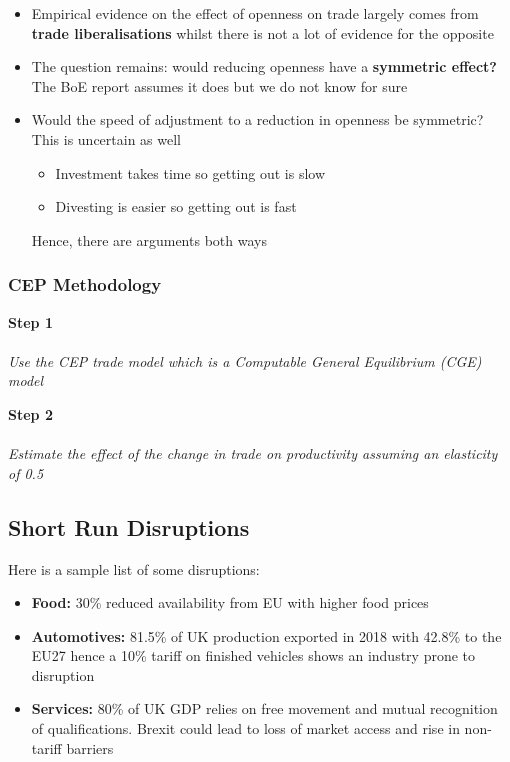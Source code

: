 \documentclass[12pt, letterpaper]{article}
\begin{document}
\begin{itemize}
	\item Empirical evidence on the effect of openness on trade largely comes from \textbf{trade liberalisations} whilst there is not a lot of evidence for the opposite
	\item The question remains: would reducing openness have a \textbf{symmetric effect?} The BoE report assumes it does but we do not know for sure
	\item Would the speed of adjustment to a reduction in openness be symmetric? This is uncertain as well
		\begin{itemize}
			\item Investment takes time so getting out is slow
			\item Divesting is easier so getting out is fast
		\end{itemize}
	Hence, there are arguments both ways
\end{itemize}

\subsubsection{CEP Methodology}
\textbf{Step 1}\\\\
\textit{Use the CEP trade model which is a Computable General Equilibrium (CGE) model}
\begin{center}
	\noindent{}
\end{center}
\textbf{Step 2}\\\\
\textit{Estimate the effect of the change in trade on productivity assuming an elasticity of 0.5}

\subsection{Short Run Disruptions}
Here is a sample list of some disruptions:
\begin{itemize}
	\item \textbf{Food:} 30\% reduced availability from EU with higher food prices
	\item \textbf{Automotives:} 81.5\% of UK production exported in 2018 with 42.8\% to the EU27 hence a 10\% tariff on finished vehicles shows an industry prone to disruption
	\item \textbf{Services:} 80\% of UK GDP relies on free movement and mutual recognition of qualifications. Brexit could lead to loss of market access and rise in non-tariff barriers
\end{itemize}
\end{document}
